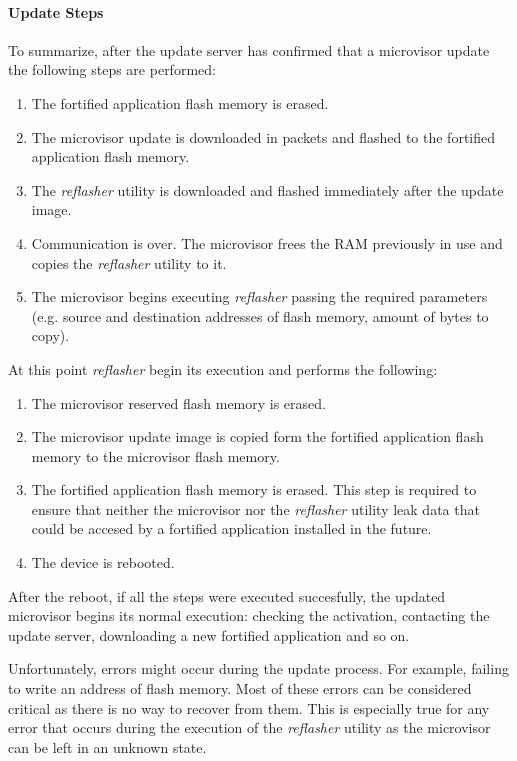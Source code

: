 \documentclass{article}
\begin{document}
\paragraph{Update Steps}
To summarize, after the update server has confirmed that a microvisor update the following steps are performed:
\begin{enumerate}
	\item The fortified application flash memory is erased.
	\item The microvisor update is downloaded in packets and flashed to the fortified application flash memory.
	\item The \textit{reflasher} utility is downloaded and flashed immediately after the update image.
	\item Communication is over. The microvisor frees the RAM previously in use and copies the \textit{reflasher} utility to it.
	\item The microvisor begins executing \textit{reflasher} passing the required parameters (e.g. source and destination addresses of flash memory, amount of bytes to copy).
\end{enumerate}
At this point \textit{reflasher} begin its execution and performs the following:
\begin{enumerate}
	\item The microvisor reserved flash memory is erased.
	\item The microvisor update image is copied form the fortified application flash memory to the microvisor flash memory.
	\item The fortified application flash memory is erased. This step is required to ensure that neither the microvisor nor the \textit{reflasher} utility leak data that could be accesed by a fortified application installed in the future.
	\item The device is rebooted.
\end{enumerate}
After the reboot, if all the steps were executed succesfully, the updated microvisor begins its normal execution: checking the activation, contacting the update server, downloading a new fortified application and so on.

Unfortunately, errors might occur during the update process. For example, failing to write an address of flash memory. Most of these errors can be considered critical as there is no way to recover from them. This is especially true for any error that occurs during the execution of the \textit{reflasher} utility as the microvisor can be left in an unknown state.
\end{document}
